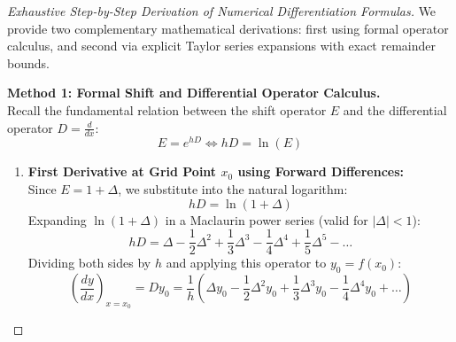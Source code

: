 \begin{proof}[Exhaustive Step-by-Step Derivation of Numerical Differentiation Formulas]
We provide two complementary mathematical derivations: first using formal operator calculus, and second via explicit Taylor series expansions with exact remainder bounds.

\medskip
\noindent\textbf{Method 1: Formal Shift and Differential Operator Calculus.} \\
Recall the fundamental relation between the shift operator $E$ and the differential operator $D = \frac{d}{dx}$:
\begin{equation}
    E = e^{h D} \iff h D = \ln(E)
\end{equation}
\begin{enumerate}
    \item \textbf{First Derivative at Grid Point $x_0$ using Forward Differences:} \\
    Since $E = 1 + \Delta$, we substitute into the natural logarithm:
    \begin{equation}
        h D = \ln(1 + \Delta)
    \end{equation}
    Expanding $\ln(1 + \Delta)$ in a Maclaurin power series (valid for $|\Delta| < 1$):
    \begin{equation}
        h D = \Delta - \frac{1}{2}\Delta^2 + \frac{1}{3}\Delta^3 - \frac{1}{4}\Delta^4 + \frac{1}{5}\Delta^5 - \dots
    \end{equation}
    Dividing both sides by $h$ and applying this operator to $y_0 = f(x_0)$:
    \begin{equation}
        \boxed{\left(\frac{dy}{dx}\right)_{x=x_0} = D y_0 = \frac{1}{h}\left( \Delta y_0 - \frac{1}{2}\Delta^2 y_0 + \frac{1}{3}\Delta^3 y_0 - \frac{1}{4}\Delta^4 y_0 + \dots \right)}
    \end{equation}
    

\end{enumerate}
\end{proof}
